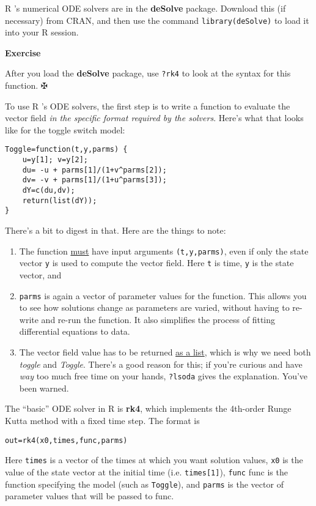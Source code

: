 \documentclass [11pt]{article}
\newcommand{\blst}{\vspace{-0.035in} \begin{lstlisting}}
\newcommand{\ttt}[1]{\texttt{#1}}
\newcounter{exercise}
\numberwithin{exercise}{section}
\newcommand{\exnumber}{\addtocounter{exercise}{1} \theexercise \thinspace}
\def\R{R }
\begin{document}
\R's numerical ODE solvers are in the \textbf{deSolve} package. Download this (if necessary) from
CRAN, and then use the command \ttt{library(deSolve)} to load it into your \R session.   

{\bf Exercise \exnumber} After you load the \textbf{deSolve} package, use \ttt{?rk4} to look at the 
syntax for this function.  $\maltese$ 

To use \R's ODE solvers, the first step is to write a function to evaluate 
the vector field \textit{in the specific format required by the solvers}. Here's what that looks like
for the toggle switch model:
\blst
Toggle=function(t,y,parms) {
    u=y[1]; v=y[2];
    du= -u + parms[1]/(1+v^parms[2]);
    dv= -v + parms[1]/(1+u^parms[3]);
    dY=c(du,dv); 
    return(list(dY)); 
}
\end{lstlisting} 
There's a bit to digest in that. Here are the things to note:
\begin{enumerate}
\vspace*{-0.12in}
\item The function \underline{must} have input arguments \ttt{(t,y,parms)}, even if only the state
vector \ttt{y} is used to compute the vector field. Here \ttt{t} is time, \ttt{y} is the state vector,
and \item \ttt{parms} is again a vector of parameter values for the function. This allows you to
see how solutions change as parameters are varied, without having to re-write and re-run the function. It also simplifies
the process of fitting differential equations to data. 
\item The vector field value has to be returned \underline{as a list}, which is why we need both
\textit{toggle} and \textit{Toggle}. There's a good reason for this;
if you're curious and have \textit{way} too much free time on your hands, \ttt{?lsoda} gives  
the explanation. You've been warned.  
\end{enumerate} 

The ``basic'' ODE solver in \R is \textbf{rk4}, which implements the 4th-order Runge
Kutta method with a fixed time step. The format is 
\blst 
out=rk4(x0,times,func,parms) 
\end{lstlisting}
Here \ttt{times} is a vector of the times at which you want solution values, 
\ttt{x0} is the value of the state vector at the initial time (i.e. \ttt{times[1]}), 
\ttt{func} func is the function specifying the model (such as \ttt{Toggle}),
and \ttt{parms} is the vector of parameter values that will be passed to func. 
\end{document}
